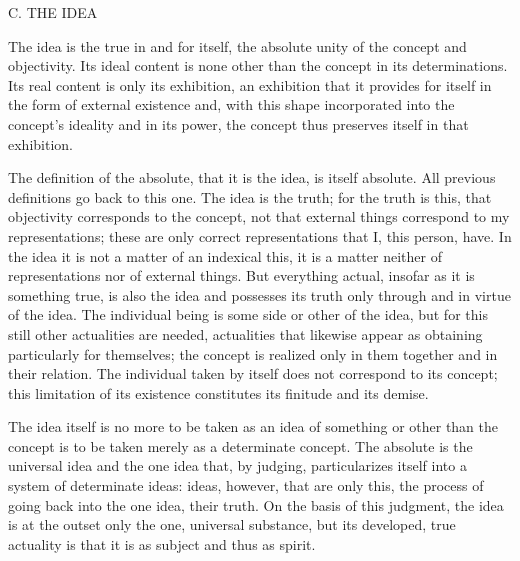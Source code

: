 C. THE IDEA

The idea is the true in and for itself,
the absolute unity of the concept and objectivity.
Its ideal content is none other than the concept in its determinations.
Its real content is only its exhibition, an exhibition
that it provides for itself in the form of external existence and,
with this shape incorporated into the concept's ideality and in its power,
the concept thus preserves itself in that exhibition.

    The definition of the absolute, that it is the idea, is itself absolute.
    All previous definitions go back to this one.
    The idea is the truth; for the truth is this,
    that objectivity corresponds to the concept,
    not that external things correspond to my representations;
    these are only correct representations that I, this person, have.
    In the idea it is not a matter of an indexical this,
    it is a matter neither of representations nor of external things.
    But everything actual, insofar as it is something true, is also the idea
    and possesses its truth only through and in virtue of the idea.
    The individual being is some side or other of the idea,
    but for this still other actualities are needed,
    actualities that likewise appear as obtaining particularly for themselves;
    the concept is realized only in them together and in their relation.
    The individual taken by itself does not correspond to its concept;
    this limitation of its existence constitutes its finitude and its demise.

    The idea itself is no more to be taken as an idea of something or other
    than the concept is to be taken merely as a determinate concept.
    The absolute is the universal idea and the one idea that, by judging,
    particularizes itself into a system of determinate ideas:
    ideas, however, that are only this, the process of going back into
    the one idea, their truth.
    On the basis of this judgment, the idea is at the outset only
    the one, universal substance, but its developed, true actuality is
    that it is as subject and thus as spirit.

